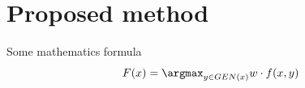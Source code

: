 \chapter{Proposed method}

Some mathematics formula $$F(x) = \argmax_{y \in GEN(x)} w \cdot f(x, y)$$
